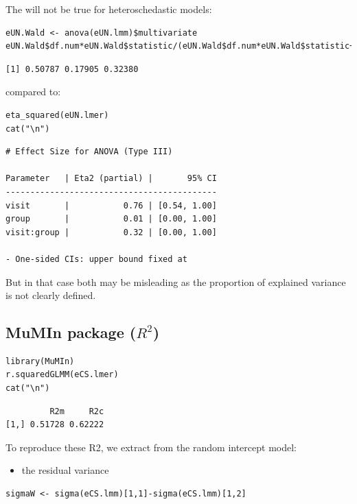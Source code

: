 \documentclass[12pt]{article}
\begin{document}
The will not be true for heteroschedastic models:
\lstset{language=r,label= ,caption= ,captionpos=b,numbers=none}
\begin{lstlisting}
eUN.Wald <- anova(eUN.lmm)$multivariate
eUN.Wald$df.num*eUN.Wald$statistic/(eUN.Wald$df.num*eUN.Wald$statistic+eUN.Wald$df.denom)
\end{lstlisting}

\begin{verbatim}
[1] 0.50787 0.17905 0.32380
\end{verbatim}


compared to:
\lstset{language=r,label= ,caption= ,captionpos=b,numbers=none}
\begin{lstlisting}
eta_squared(eUN.lmer)
cat("\n")
\end{lstlisting}

\begin{verbatim}
# Effect Size for ANOVA (Type III)

Parameter   | Eta2 (partial) |       95% CI
-------------------------------------------
visit       |           0.76 | [0.54, 1.00]
group       |           0.01 | [0.00, 1.00]
visit:group |           0.32 | [0.00, 1.00]

- One-sided CIs: upper bound fixed at
\end{verbatim}


But in that case both may be misleading as the proportion of explained
variance is not clearly defined.

\subsection{MuMIn package (\(R^2\))}
\label{sec:orgd6767a0}

\lstset{language=r,label= ,caption= ,captionpos=b,numbers=none}
\begin{lstlisting}
library(MuMIn)
r.squaredGLMM(eCS.lmer)
cat("\n")
\end{lstlisting}

\begin{verbatim}
         R2m     R2c
[1,] 0.51728 0.62222
\end{verbatim}


To reproduce these R2, we extract from the random intercept model:
\begin{itemize}
\item the residual variance
\end{itemize}
\lstset{language=r,label= ,caption= ,captionpos=b,numbers=none}
\begin{lstlisting}
sigmaW <- sigma(eCS.lmm)[1,1]-sigma(eCS.lmm)[1,2]
\end{lstlisting}
\end{document}
